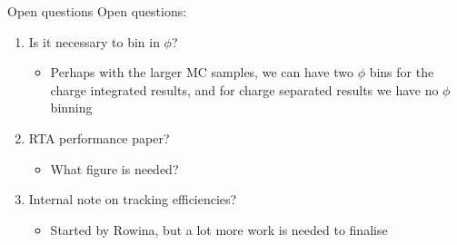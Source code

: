 \documentclass[xcolor={dvipsnames}]{beamer}
\begin{document}
\begin{frame}{Open questions}
  \vspace{0.0cm}
  {\Large Open questions:}
  \vspace{0.2cm}
  \begin{enumerate}
    \setlength\itemsep{1.0em}
    \item{Is it necessary to bin in $\phi$?}
    \begin{itemize}
      \item[-]{Perhaps with the larger MC samples, we can have two $\phi$ bins for the charge integrated results, and for charge separated results we have no $\phi$ binning}
    \end{itemize}
    \item{RTA performance paper?}
    \begin{itemize}
      \item[-]{What figure is needed?}
    \end{itemize}
    \item{Internal note on tracking efficiencies?}
    \begin{itemize}
      \item[-]{Started by Rowina, but a lot more work is needed to finalise}
    \end{itemize}
  \end{enumerate}
\end{frame}
\end{document}
